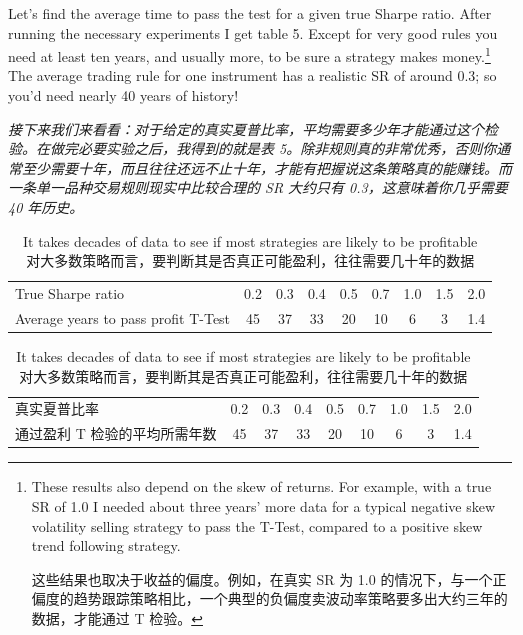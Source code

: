 \begin{englishblock} Let's find the average time to pass the test for a given true Sharpe ratio. After running the necessary experiments I get table 5. Except for very good rules you need at least ten years, and usually more, to be sure a strategy makes money.\footnote{These results also depend on the skew of returns. For example, with a true SR of 1.0 I needed about three years' more data for a typical negative skew volatility selling strategy to pass the T-Test, compared to a positive skew trend following strategy. \par 这些结果也取决于收益的偏度。例如，在真实 SR 为 1.0 的情况下，与一个正偏度的趋势跟踪策略相比，一个典型的负偏度卖波动率策略要多出大约三年的数据，才能通过 T 检验。} The average trading rule for one instrument has a realistic SR of around 0.3; so you'd need nearly 40 years of history! \end{englishblock}

\begin{chineseblock} \textit{接下来我们来看看：对于给定的真实夏普比率，平均需要多少年才能通过这个检验。在做完必要实验之后，我得到的就是表 5。除非规则真的非常优秀，否则你通常至少需要十年，而且往往还远不止十年，才能有把握说这条策略真的能赚钱。而一条单一品种交易规则现实中比较合理的 SR 大约只有 0.3，这意味着你几乎需要 40 年历史。}\end{chineseblock}

\begin{table}[htbp] \centering \small \caption{It takes decades of data to see if most strategies are likely to be profitable\\
对大多数策略而言，要判断其是否真正可能盈利，往往需要几十年的数据}\begin{englishtableblock} \begin{tabular}{@{} lcccccccc@{}}
\toprule
True Sharpe ratio & 0.2 & 0.3 & 0.4 & 0.5 & 0.7 & 1.0 & 1.5 & 2.0 \\
Average years to pass profit T-Test & 45 & 37 & 33 & 20 & 10 & 6 & 3 & 1.4 \\
\bottomrule
\end{tabular}
\end{englishtableblock}

  \medskip

\begin{chinesetableblock} \begin{tabular}{@{} lcccccccc@{}}
\toprule
真实夏普比率 & 0.2 & 0.3 & 0.4 & 0.5 & 0.7 & 1.0 & 1.5 & 2.0 \\
通过盈利 T 检验的平均所需年数 & 45 & 37 & 33 & 20 & 10 & 6 & 3 & 1.4 \\
\bottomrule
\end{tabular}
\end{chinesetableblock}
\end{table}


